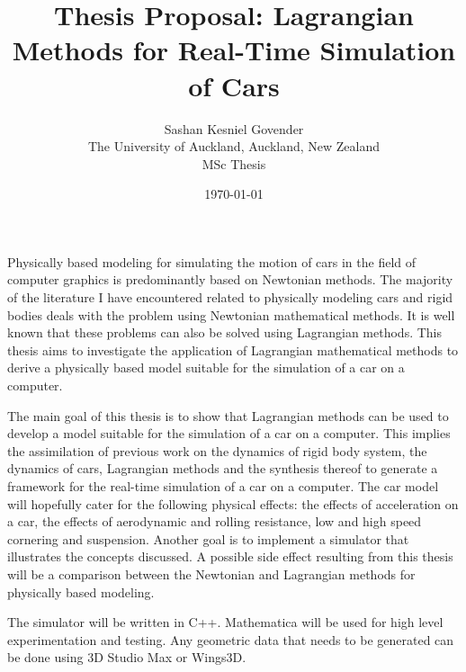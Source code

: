 

\title{\bfseries Thesis Proposal: Lagrangian Methods for Real-Time Simulation of Cars}
\date{\today}
\author{Sashan Kesniel Govender \\
The University of Auckland, Auckland, New Zealand \\
MSc Thesis} 
\maketitle

Physically based modeling for simulating the motion of cars in the field of computer graphics is predominantly based on Newtonian methods. The majority of the literature \cite{Otte, Bourg, Beckman, Genta} I have encountered related to physically modeling cars and rigid bodies deals with the problem using Newtonian mathematical methods. It is well known that these problems can also be solved using Lagrangian methods. This thesis aims to investigate the application of Lagrangian mathematical methods to derive a physically based model suitable for the simulation of a car on a computer.

The main goal of this thesis is to show that Lagrangian methods can be used to develop a model suitable for the simulation of a car on a computer. This implies the assimilation of previous work on the dynamics of rigid body system, the dynamics of cars, Lagrangian methods and the synthesis thereof to generate a framework for the real-time simulation of a car on a computer. The car model will hopefully cater for the following physical effects: the effects of acceleration on a car, the effects of aerodynamic and rolling resistance, low and high speed cornering and suspension. Another goal is to implement a simulator that illustrates the concepts discussed. A possible side effect resulting from this thesis will be a comparison between the Newtonian and Lagrangian methods for physically based modeling. 

The simulator will be written in C++. Mathematica will be used for high level experimentation and testing. Any geometric data that needs to be generated can be done using 3D Studio Max or Wings3D.



